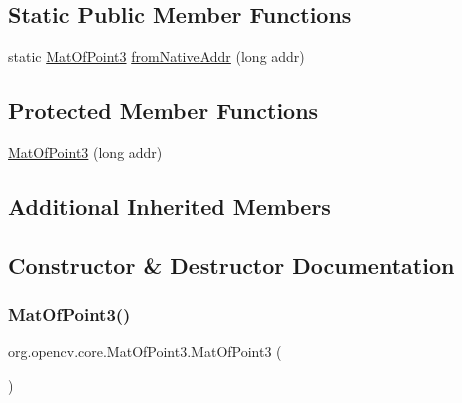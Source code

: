 \subsection*{Static Public Member Functions}
\begin{DoxyCompactItemize}
\item 
static \mbox{\hyperlink{classorg_1_1opencv_1_1core_1_1_mat_of_point3}{Mat\+Of\+Point3}} \mbox{\hyperlink{classorg_1_1opencv_1_1core_1_1_mat_of_point3_ae1f1937594939378fd31f7258e9f05de}{from\+Native\+Addr}} (long addr)
\end{DoxyCompactItemize}
\subsection*{Protected Member Functions}
\begin{DoxyCompactItemize}
\item 
\mbox{\hyperlink{classorg_1_1opencv_1_1core_1_1_mat_of_point3_a284008ebe65da3802d6e77c065d9507a}{Mat\+Of\+Point3}} (long addr)
\end{DoxyCompactItemize}
\subsection*{Additional Inherited Members}


\subsection{Constructor \& Destructor Documentation}
\mbox{\label{classorg_1_1opencv_1_1core_1_1_mat_of_point3_acf0234de1fb5dde8d1af630c4b3b1f81}} 
\subsubsection{\texorpdfstring{Mat\+Of\+Point3()}{MatOfPoint3()}\hspace{0.1cm}{\footnotesize\ttfamily [1/4]}}
{\footnotesize\ttfamily org.\+opencv.\+core.\+Mat\+Of\+Point3.\+Mat\+Of\+Point3 (\begin{DoxyParamCaption}{ }\end{DoxyParamCaption})}

\mbox{\label{classorg_1_1opencv_1_1core_1_1_mat_of_point3_a284008ebe65da3802d6e77c065d9507a}} 
